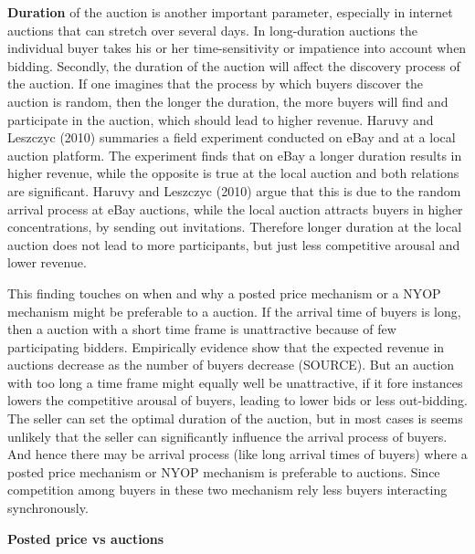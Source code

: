\documentclass[a4paper,12pt]{article}
\begin{document}
{\bf Duration} of the auction is another important parameter, especially in internet auctions that can stretch over several days. In long-duration auctions the individual buyer takes his or her time-sensitivity or impatience into account when bidding. Secondly, the duration of the auction will affect the discovery process of the auction. If one imagines that the process by which buyers discover the auction is random, then the longer the duration, the more buyers will find and participate in the auction, which should lead to higher revenue. Haruvy and Leszczyc (2010) summaries a field experiment conducted on eBay and at a local auction platform. The experiment finds that on eBay a longer duration results in higher revenue, while the opposite is true at the local auction and both relations are significant. Haruvy and Leszczyc (2010) argue that this is due to the random arrival process at eBay auctions, while the local auction attracts buyers in higher concentrations, by sending out invitations. Therefore longer duration at the local auction does not lead to more participants, but just less competitive arousal and lower revenue. 

This finding touches on when and why a posted price mechanism or a NYOP mechanism might be preferable to a auction. If the arrival time of buyers is long, then a auction with a short time frame is unattractive because of few participating bidders. Empirically evidence show that the expected revenue in auctions decrease as the number of buyers decrease (SOURCE). But an auction with too long a time frame might equally well be unattractive, if it fore instances lowers the competitive arousal of buyers, leading to lower bids or less out-bidding. The seller can set the optimal duration of the auction, but in most cases is seems unlikely that the seller can significantly influence the arrival process of buyers. And hence there may be arrival process (like long arrival times of buyers) where a posted price mechanism or NYOP mechanism is preferable to auctions. Since competition among buyers in these two mechanism rely less buyers interacting synchronously.



	{\bf Posted price vs auctions}
\end{document}
